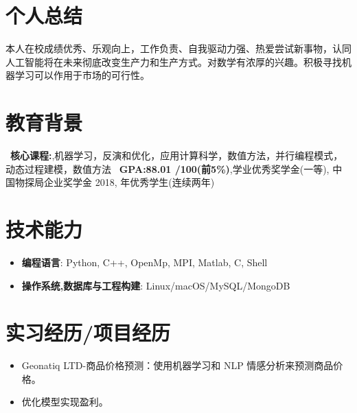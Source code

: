 \documentclass{resume}
\begin{document}


 
\section{个人总结}
本人在校成绩优秀、乐观向上，工作负责、自我驱动力强、热爱尝试新事物，认同人工智能将在未来彻底改变生产力和生产方式。对数学有浓厚的兴趣。积极寻找机器学习可以作用于市场的可行性。

\section{教育背景}
\ \textbf{核心课程:},机器学习，反演和优化，应用计算科学，数值方法，并行编程模式，动态过程建模，数值方法
\ \textbf{GPA:88.01 /100(前5\%)},学业优秀奖学金(一等), 中国物探局企业奖学金 2018, 年优秀学生(连续两年)

\section{技术能力}
\begin{itemize}[parsep=0.2ex]
  \item \textbf{编程语言}: Python, C++, OpenMp, MPI, Matlab, C, Shell
  \item \textbf{操作系统,数据库与工程构建}: Linux/macOS/MySQL/MongoDB
\end{itemize}


\section{实习经历/项目经历}
\begin{itemize}
  \item Geonatiq LTD-商品价格预测：使用机器学习和 NLP 情感分析来预测商品价格。
  \item 优化模型实现盈利。
\end{itemize}
\end{document}
